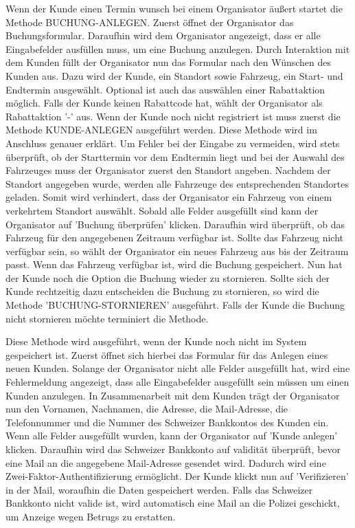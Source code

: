 
Wenn der Kunde einen Termin wunsch bei einem Organisator äußert startet die Methode BUCHUNG-ANLEGEN. Zuerst öffnet der Organisator das Buchungsformular. Daraufhin wird dem Organisator angezeigt, dass er alle Eingabefelder ausfüllen muss, um eine Buchung anzulegen. Durch Interaktion mit dem Kunden füllt der Organisator nun das Formular nach den Wünschen des Kunden aus. Dazu wird der Kunde, ein Standort sowie Fahrzeug, ein Start- und Endtermin ausgewählt. Optional ist auch das auswählen einer Rabattaktion möglich. Falls der Kunde keinen Rabattcode hat, wählt der Organisator als Rabattaktion '-' aus. Wenn der Kunde noch nicht registriert ist muss zuerst die Methode KUNDE-ANLEGEN ausgeführt werden. Diese Methode wird im Anschluss genauer erklärt. Um Fehler bei der Eingabe zu vermeiden, wird stets überprüft, ob der Starttermin vor dem Endtermin liegt und bei der Auswahl des Fahrzeuges muss der Organisator zuerst den Standort angeben. Nachdem der Standort angegeben wurde, werden alle Fahrzeuge des entsprechenden Standortes geladen. Somit wird verhindert, dass der Organisator ein Fahrzeug von einem verkehrtem Standort auswählt.
Sobald alle Felder ausgefüllt sind kann der Organisator auf 'Buchung überprüfen' klicken. Daraufhin wird überprüft, ob das Fahrzeug für den angegebenen Zeitraum verfügbar ist. Sollte das Fahrzeug nicht verfügbar sein, so wählt der Organisator ein neues Fahrzeug aus bis der Zeitraum passt. Wenn das Fahrzeug verfügbar ist, wird die Buchung gespeichert. Nun hat der Kunde noch die Option die Buchung wieder zu stornieren. Sollte sich der Kunde rechtzeitig dazu entscheiden die Buchung zu stornieren, so wird die Methode 'BUCHUNG-STORNIEREN' ausgeführt. Falls der Kunde die Buchung nicht stornieren möchte terminiert die Methode.

 \label{code:KundeAnlegen}
Diese Methode wird ausgeführt, wenn der Kunde noch nicht im System gespeichert ist. Zuerst öffnet sich hierbei das Formular für das Anlegen eines neuen Kunden. Solange der Organisator nicht alle Felder ausgefüllt hat, wird eine Fehlermeldung angezeigt, dass alle Eingabefelder ausgefüllt sein müssen um einen Kunden anzulegen. In Zusammenarbeit mit dem Kunden trägt der Organisator nun den Vornamen, Nachnamen, die Adresse, die Mail-Adresse, die Telefonnummer und die Nummer des Schweizer Bankkontos des Kunden ein. Wenn alle Felder ausgefüllt wurden, kann der Organisator auf 'Kunde anlegen' klicken. Daraufhin wird das Schweizer Bankkonto auf validität überprüft, bevor eine Mail an die angegebene Mail-Adresse gesendet wird. Dadurch wird eine Zwei-Faktor-Authentifizierung ermöglicht. Der Kunde klickt nun auf 'Verifizieren' in der Mail, woraufhin die Daten gespeichert werden. Falls das Schweizer Bankkonto nicht valide ist, wird automatisch eine Mail an die Polizei geschickt, um Anzeige wegen Betrugs zu erstatten. 

